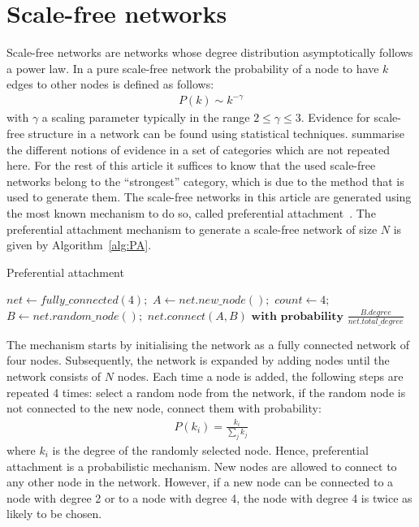 \documentclass[11pt]{article}
\begin{document}
\section{Scale-free networks\label{sec:SF}}
Scale-free networks are networks whose degree distribution asymptotically follows a power law. In a pure scale-free
network the probability of a node to have $k$ edges to other nodes is defined as follows:
\begin{align}
    P(k) \sim k^{-\gamma}
\end{align}
with $\gamma$ a scaling parameter typically in the range $2 \leq \gamma \leq 3$. Evidence for scale-free structure in a
network can be found using statistical techniques.  summarise the different
notions of evidence in a set of categories which are not repeated here. For the rest of this article it suffices to
know that the used scale-free networks belong to the ``strongest'' category, which is due to the method that is used to
generate them. The scale-free networks in this article are generated using the most known mechanism to do so, called
preferential attachment~. The preferential attachment mechanism to
generate a scale-free network of size $N$ is given by Algorithm~\ref{alg:PA}.

\begin{algorithm}
    \caption{Preferential attachment \protect{}}\label{alg:PA}
    \begin{algorithmic}[1]
        \State $net \gets fully\_connected(4);$
        \State $A \gets net.new\_node();$
        \State $count \gets 4;$
        \State $B \gets net.random\_node();$
        \State $net.connect(A,B) \textbf{ with probability } \frac{B.degree}{net.total\_degree}$
        \EndIf
        \EndWhile
        \EndWhile
    \end{algorithmic}
\end{algorithm}
\noindent
The mechanism starts by initialising the network as a fully connected network of four nodes. Subsequently, the network
is expanded by adding nodes until the network consists of $N$ nodes. Each time a node is added, the following steps are
repeated 4 times: select a random node from the network, if the random node is not connected to the new node, connect
them with probability:
\begin{align*}
    P(k_i) = \frac{k_i}{\sum_{j} k_j}
\end{align*}
where $k_i$ is the degree of the randomly selected node. Hence, preferential attachment is a probabilistic mechanism.
New nodes are allowed to connect to any other node in the network. However, if a new node can be connected to a node
with degree 2 or to a node with degree 4, the node with degree 4 is twice as likely to be chosen.
\end{document}

